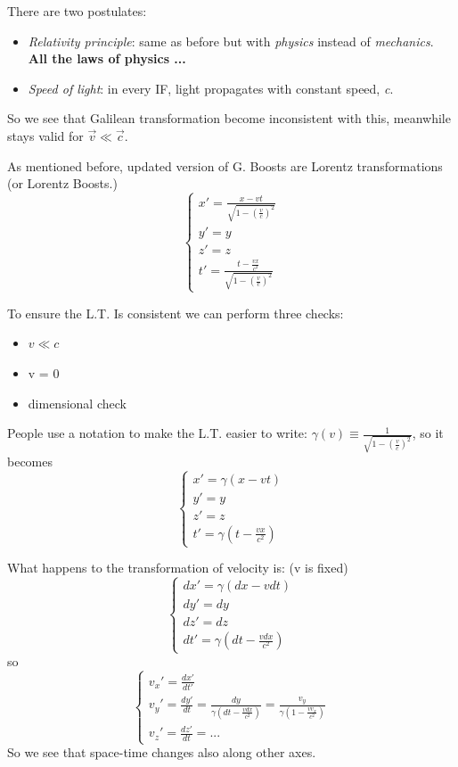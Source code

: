There are two postulates: \par
\begin{itemize}
	\item \emph{Relativity principle}: same as before but with \emph{physics} instead of \emph{mechanics}. \textbf{All the laws of physics ...}
	\item \emph{Speed of light}: in every IF, light propagates with constant speed, \emph{c}.
\end{itemize}
So we see that Galilean transformation become inconsistent with this, meanwhile stays valid for $\vec{v} \ll \vec{c}$.\par
As mentioned before, updated version of G. Boosts are Lorentz transformations (or Lorentz Boosts.)
\begin{equation}
\begin{cases}
	x' = \frac{x-vt}{\sqrt{1-(\frac{v}{c})^{2}}} \\
	y' = y \\
	z' = z \\
	t' = \frac{t- \frac{vx}{c^{2}}}{\sqrt{1-(\frac{v}{c})^{2}}}
\end{cases}
\end{equation}

To ensure the L.T. Is consistent we can perform three checks:
\begin{itemize}
	\item $v \ll c$
	\item v = 0
	\item dimensional check
\end{itemize}
People use a notation to make the L.T. easier to write: $\gamma(v) \equiv \frac{1}{\sqrt{1-(\frac{v}{c})^{2}}} $, so it becomes
\begin{equation}
\begin{cases}
x' = \gamma (x-vt) \\
y' = y \\
z' = z \\
t' = \gamma (t- \frac{vx}{c^{2}})
\end{cases}
\end{equation}

What happens to the transformation of velocity is: (v is fixed) 
\begin{equation}
\begin{cases}
dx' = \gamma(dx -vdt) \\
dy' = dy \\
dz' = dz \\
dt' = \gamma \left(dt - \frac{v dx}{c^{2}}\right)
\end{cases}
\end{equation}
 so 
\begin{equation}
\begin{cases}
 v_{x}' = \frac{dx'}{dt'} \\
 v_{y}' = \frac{dy'}{dt} = \frac{dy}{\gamma \left(dt - \frac{vdx}{c^{2}}\right)} = \frac{v_{y}}{\gamma \left(1- \frac{v v_{x}}{c^{2}}\right)} \\
v_{z}' = \frac{dz'}{dt} = ...
\end{cases}
\end{equation}
So we see that space-time changes also along other axes.\par

